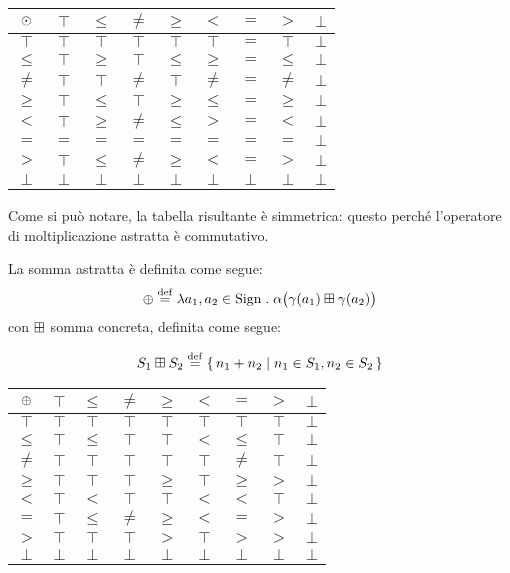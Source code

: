 \begin{center}
  \begin{tabular}{ c | c c c c c c c c }
    $\mathbin{\odot}$ & $\top$ & $\leq$ & $\neq$ & $\geq$ & $<$ & $=$ & $>$ & $\bot$ \\
    \hline
    $\top$ & $\top$ & $\top$ & $\top$ & $\top$ & $\top$ & $=$ & $\top$ & $\bot$  \\
    $\leq$ & $\top$ & $\geq$ & $\top$ & $\leq$ & $\geq$ & $=$ & $\leq$ & $\bot$\\
    $\neq$ & $\top$ & $\top$ & $\neq$ & $\top$ & $\neq$ & $=$ & $\neq$ & $\bot$ \\
    $\geq$ & $\top$ & $\leq$ & $\top$ & $\geq$ & $\leq$ & $=$ & $\geq$ & $\bot$ \\
    $<$ & $\top$ & $\geq$ & $\neq$ & $\leq$ & $>$ & $=$ & $<$ & $\bot$ \\
    $=$ & $=$ & $=$ & $=$ & $=$ & $=$ & $=$ & $=$ & $\bot$\\
    $>$ & $\top$ & $\leq$ & $\neq$ & $\geq$ & $<$ & $=$ & $>$ & $\bot$\\
    $\bot$ & $\bot$ & $\bot$ & $\bot$ & $\bot$ & $\bot$ & $\bot$ & $\bot$ & $\bot$ \\
  \end{tabular}
\end{center}

Come si può notare, la tabella risultante è simmetrica:
questo perché l'operatore di moltiplicazione astratta è commutativo.

\begin{definizione}
La somma astratta è definita come segue:
\[
  \absadd \defeq \lambda a_1,a_2 \in \Sign \st \alpha\bigl(\gamma(a_1) \conadd \gamma(a_2)\bigr)
\]
con $\mathbin{\boxplus}$ somma concreta, definita come segue:

\[
  S_1 \conadd S_2 \defeq \{\, n_1 + n_2 \mid n_1 \in S_1, n_2 \in S_2 \,\}
\]
\end{definizione}

\begin{center}
  \begin{tabular}{c | c c c c c c c c}
    $\mathbin{\oplus}$ & $\top$ & $\leq$ & $\neq$ & $\geq$ & $<$ & $=$ & $>$ & $\bot$ \\
    \hline
    $\top$ & $\top$ & $\top$ & $\top$ & $\top$ & $\top$ & $\top$ & $\top$ & $\bot$ \\
    $\leq$ & $\top$ & $\leq$ & $\top$ & $\top$ & $<$ & $\leq$ & $\top$ & $\bot$\\
    $\neq$ & $\top$ & $\top$ & $\top$ & $\top$ & $\top$ & $\neq$ & $\top$ & $\bot$ \\
    $\geq$ & $\top$ & $\top$ & $\top$ & $\geq$ & $\top$ & $\geq$ & $>$ & $\bot$\\
    $<$ & $\top$ & $<$ & $\top$ & $\top$ & $<$ & $<$ & $\top$ & $\bot$\\
    $=$ & $\top$ & $\leq$ & $\neq$ & $\geq$ & $<$ & $=$ & $>$ & $\bot$\\
    $>$ & $\top$ & $\top$ & $\top$ & $>$ & $\top$ & $>$ & $>$ & $\bot$ \\
    $\bot$ & $\bot$ & $\bot$ & $\bot$ & $\bot$ & $\bot$ & $\bot$ & $\bot$ & $\bot$
  \end{tabular}
\end{center}

